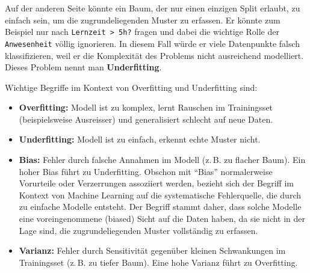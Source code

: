 \begin{myattention}[Underfitting]
    Auf der anderen Seite könnte ein Baum, der nur einen einzigen Split erlaubt, zu einfach sein, um die zugrundeliegenden Muster zu erfassen. Er könnte zum Beispiel nur nach \texttt{Lernzeit > 5h?} fragen und dabei die wichtige Rolle der \texttt{Anwesenheit} völlig ignorieren. In diesem Fall würde er viele Datenpunkte falsch klassifizieren, weil er die Komplexität des Problems nicht ausreichend modelliert. Dieses Problem nennt man \textbf{Underfitting}.
\end{myattention}

\begin{mydefinition}
    Wichtige Begriffe im Kontext von Overfitting und Underfitting sind:
    \begin{itemize}
        \item \textbf{Overfitting:} Modell ist zu komplex, lernt Rauschen im Trainingsset (beispielsweise Ausreisser) und generalisiert schlecht auf neue Daten.
        \item \textbf{Underfitting:} Modell ist zu einfach, erkennt echte Muster nicht.
        \item \textbf{Bias:} Fehler durch falsche Annahmen im Modell (z.\,B. zu flacher Baum). Ein hoher Bias führt zu Underfitting. Obschon mit \enquote{Bias} normalerweise Vorurteile oder Verzerrungen assoziiert werden, bezieht sich der Begriff im Kontext von Machine Learning auf die systematische Fehlerquelle, die durch zu einfache Modelle entsteht. Der Begriff stammt daher, dass solche Modelle eine voreingenommene (biased) Sicht auf die Daten haben, da sie nicht in der Lage sind, die zugrundeliegenden Muster vollständig zu erfassen.
        \item \textbf{Varianz:} Fehler durch Sensitivität gegenüber kleinen Schwankungen im Trainingsset (z.\,B. zu tiefer Baum). Eine hohe Varianz führt zu Overfitting.
    \end{itemize}
\end{mydefinition}


